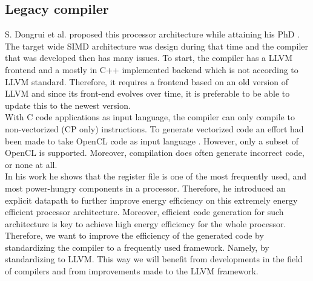 

\subsection{Legacy compiler}\label{sec:legacy_comp}
S. Dongrui et al. proposed this processor architecture \cite{simd} while attaining his PhD \cite{dongrui}. The target wide SIMD architecture was design during that time and the compiler that was developed then has many issues. To start, the compiler has a LLVM frontend and a mostly in C++ implemented backend which is not according to LLVM standard. Therefore, it requires a frontend based on an old version of LLVM and since its front-end evolves over time, it is preferable to be able to update this to the newest version. \\

With C code applications as input language, the compiler can only compile to non-vectorized (CP only) instructions. To generate vectorized code an effort had been made to take OpenCL code as input language \cite{dongrio2}. However, only a subset of OpenCL is supported. Moreover, compilation does often generate incorrect code, or none at all. \\


In his work he shows that the register file is one of the most frequently used, and most power-hungry components in a processor. Therefore, he introduced an explicit datapath to further improve energy efficiency on this extremely energy efficient processor architecture. Moreover, efficient code generation for such architecture is key to achieve high energy efficiency for the whole processor. Therefore, we want to improve the efficiency of the generated code by standardizing the compiler to a frequently used framework. Namely, by standardizing to LLVM. This way we will benefit from developments in the field of compilers and from improvements made to the LLVM framework.

